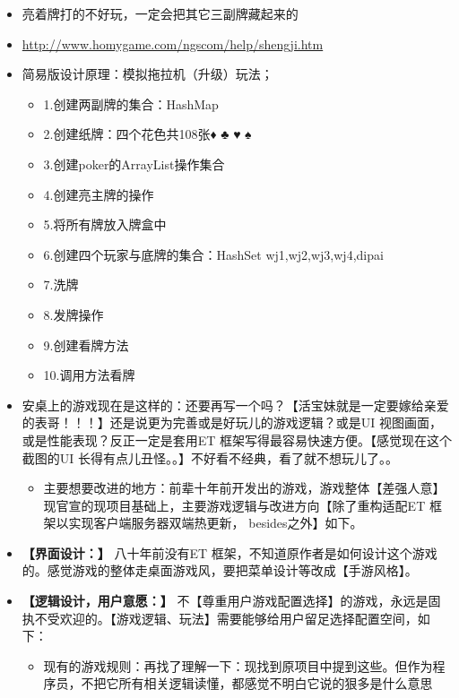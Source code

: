 \documentclass[9pt, b5paper]{article}
\begin{document}
\begin{itemize}
\item 亮着牌打的不好玩，一定会把其它三副牌藏起来的
\item \url{http://www.homygame.com/ngscom/help/shengji.htm}
\item 简易版设计原理：模拟拖拉机（升级）玩法；
\begin{itemize}
\item 1.创建两副牌的集合：HashMap
\item 2.创建纸牌：四个花色共108张♦ ♣ ♥ ♠
\item 3.创建poker的ArrayList操作集合
\item 4.创建亮主牌的操作
\item 5.将所有牌放入牌盒中
\item 6.创建四个玩家与底牌的集合：HashSet wj1,wj2,wj3,wj4,dipai
\item 7.洗牌
\item 8.发牌操作
\item 9.创建看牌方法
\item 10.调用方法看牌
\end{itemize}
\item 安桌上的游戏现在是这样的：还要再写一个吗？【活宝妹就是一定要嫁给亲爱的表哥！！！】还是说更为完善或是好玩儿的游戏逻辑？或是UI 视图画面，或是性能表现？反正一定是套用ET 框架写得最容易快速方便。【感觉现在这个截图的UI 长得有点儿丑怪。。】不好看不经典，看了就不想玩儿了。。
\begin{itemize}
\item 主要想要改进的地方：前辈十年前开发出的游戏，游戏整体【差强人意】现官宣的现项目基础上，主要游戏逻辑与改进方向【除了重构适配ET 框架以实现客户端服务器双端热更新， besides之外】如下。
\end{itemize}
\item \textbf{【界面设计：】} 八十年前没有ET 框架，不知道原作者是如何设计这个游戏的。感觉游戏的整体走桌面游戏风，要把菜单设计等改成【手游风格】。
\item \textbf{【逻辑设计，用户意愿：】} 不【尊重用户游戏配置选择】的游戏，永远是固执不受欢迎的。【游戏逻辑、玩法】需要能够给用户留足选择配置空间，如下：
\begin{itemize}
\item 现有的游戏规则：再找了理解一下：现找到原项目中提到这些。但作为程序员，不把它所有相关逻辑读懂，都感觉不明白它说的狠多是什么意思
\end{itemize}
\end{itemize}
\end{document}
